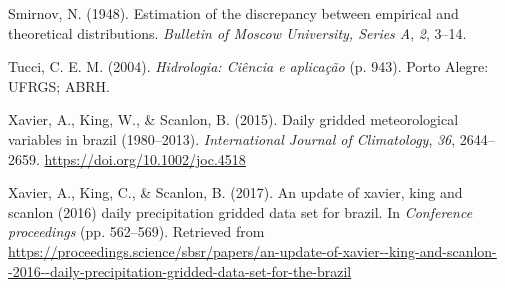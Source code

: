 \documentclass[
]{agujournal2019}
\newlength{\cslhangindent}
\newenvironment{CSLReferences}[2] %
 {\begin{list}{}{%
  \setlength{\itemindent}{0pt}
  \setlength{\leftmargin}{0pt}
  \setlength{\parsep}{0pt}
  \ifodd #1
   \setlength{\leftmargin}{\cslhangindent}
   \setlength{\itemindent}{-1\cslhangindent}
  \fi
  \setlength{\itemsep}{#2\baselineskip}}}
 {\end{list}}
\begin{document}
\begin{CSLReferences}{1}{0}
Smirnov, N. (1948). Estimation of the discrepancy between empirical and
theoretical distributions. \emph{Bulletin of Moscow University, Series
A}, \emph{2}, 3--14.

Tucci, C. E. M. (2004). \emph{Hidrologia: Ciência e aplicação} (p. 943).
Porto Alegre: UFRGS; ABRH.

Xavier, A., King, W., \& Scanlon, B. (2015). Daily gridded
meteorological variables in brazil (1980--2013). \emph{International
Journal of Climatology}, \emph{36}, 2644--2659.
\url{https://doi.org/10.1002/joc.4518}

Xavier, A., King, C., \& Scanlon, B. (2017). An update of xavier, king
and scanlon (2016) daily precipitation gridded data set for brazil. In
\emph{Conference proceedings} (pp. 562--569). Retrieved from
\url{https://proceedings.science/sbsr/papers/an-update-of-xavier--king-and-scanlon--2016--daily-precipitation-gridded-data-set-for-the-brazil}

\end{CSLReferences}
\end{document}
